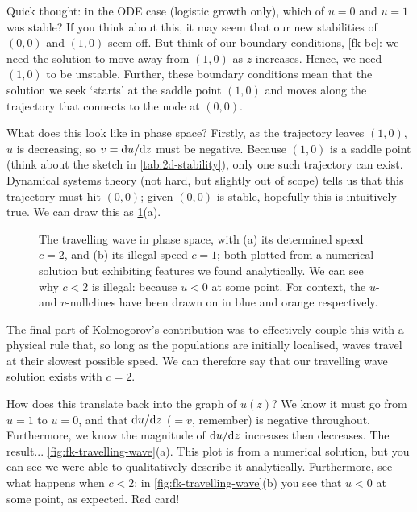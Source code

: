 \documentclass[main.tex]{subfiles}
\begin{document}
Quick thought: in the ODE case (logistic growth only), which of $u = 0$ and $u = 1$ was stable? If you think about this, it may seem that our new stabilities of $(0, 0)$ and $(1, 0)$ seem off. But think of our boundary conditions, \cref{fk-bc}: we need the solution to move away from $(1, 0)$ as $z$ increases. Hence, we need $(1, 0)$ to be unstable. Further, these boundary conditions mean that the solution we seek `starts’ at the saddle point $(1, 0)$ and moves along the trajectory that connects to the node at $(0,0)$. 

What does this look like in phase space? Firstly, as the trajectory leaves $(1,0)$, $u$ is decreasing, so $v=\fd{u}{z}$ must be negative. Because $(1,0)$ is a saddle point (think about the sketch in \cref{tab:2d-stability}), only one such trajectory can exist. Dynamical systems theory (not hard, but slightly out of scope) tells us that this trajectory must hit $(0,0)$; given $(0,0)$ is stable, hopefully this is intuitively true. 
We can draw this as \cref{fig:fk-travelling-wave-phase}(a). 

\begin{figure}
\centering

\quad

\caption{The travelling wave in phase space, with (a) its determined speed $c=2$, and (b) its illegal speed $c=1$; both plotted from a numerical solution but exhibiting features we found analytically. We can see why $c<2$ is illegal: because $u<0$ at some point. For context, the $u$- and $v$-nullclines have been drawn on in blue and orange respectively.}
\label{fig:fk-travelling-wave-phase}
\end{figure}

The final part of Kolmogorov's contribution was to effectively couple this with a physical rule that, so long as the populations are initially localised, waves travel at their slowest possible speed. We can therefore say that our travelling wave solution exists with $c=2$.

How does this translate back into the graph of $u(z)$? We know it must go from $u=1$ to $u=0$, and that $\fd{u}{z}$ ($=v$, remember) is negative throughout. Furthermore, we know the magnitude of $\fd{u}{z}$ increases then decreases. The result... \cref{fig:fk-travelling-wave}(a). This plot is from a numerical solution, but you can see we were able to qualitatively describe it analytically. Furthermore, see what happens when $c<2$: in \cref{fig:fk-travelling-wave}(b) you see that $u<0$ at some point, as expected. Red card!
\end{document}
